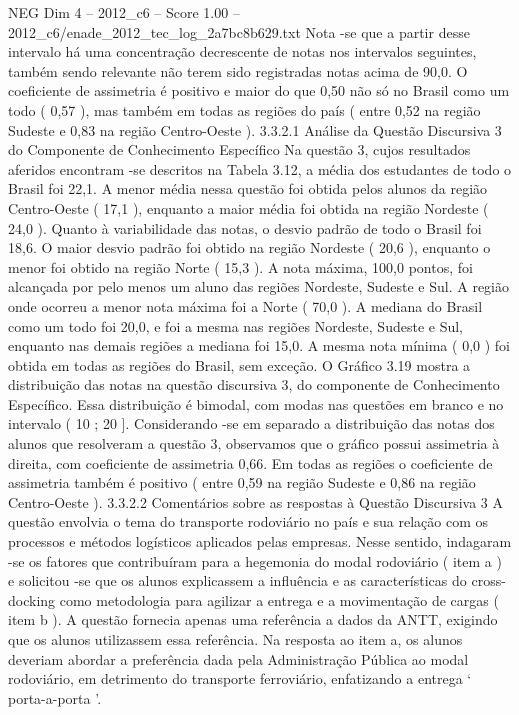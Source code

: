 \begin{textsample}{NEG Dim 4 – 2012\_c6 – Score 1.00 – 2012\_c6/enade\_2012\_tec\_log\_2a7bc8b629.txt}
Nota -se que a partir desse intervalo há uma concentração decrescente de notas nos intervalos seguintes, também sendo relevante não terem sido registradas notas acima de 90,0.
O coeficiente de assimetria é positivo e maior do que 0,50 não só no Brasil como um todo ( 0,57 ), mas também em todas as regiões do país ( entre 0,52 na região Sudeste e 0,83 na região Centro-Oeste ). 3.3.2.1 Análise da Questão Discursiva 3 do Componente de Conhecimento Específico Na questão 3, cujos resultados aferidos encontram -se descritos na Tabela 3.12, a média dos estudantes de todo o Brasil foi 22,1.
A menor média nessa questão foi obtida pelos alunos da região Centro-Oeste ( 17,1 ), enquanto a maior média foi obtida na região Nordeste ( 24,0 ).
Quanto à variabilidade das notas, o desvio padrão de todo o Brasil foi 18,6.
O maior desvio padrão foi obtido na região Nordeste ( 20,6 ), enquanto o menor foi obtido na região Norte ( 15,3 ).
A nota máxima, 100,0 pontos, foi alcançada por pelo menos um aluno das regiões Nordeste, Sudeste e Sul.
A região onde ocorreu a menor nota máxima foi a Norte ( 70,0 ).
A mediana do Brasil como um todo foi 20,0, e foi a mesma nas regiões Nordeste, Sudeste e Sul, enquanto nas demais regiões a mediana foi 15,0.
A mesma nota mínima ( 0,0 ) foi obtida em todas as regiões do Brasil, sem exceção.
O Gráfico 3.19 mostra a distribuição das notas na questão discursiva 3, do componente de Conhecimento Específico.
Essa distribuição é bimodal, com modas nas questões em branco e no intervalo ( 10 ; 20 ].
Considerando -se em separado a distribuição das notas dos alunos que resolveram a questão 3, observamos que o gráfico possui assimetria à direita, com coeficiente de assimetria 0,66.
Em todas as regiões o coeficiente de assimetria também é positivo ( entre 0,59 na região Sudeste e 0,86 na região Centro-Oeste ). 3.3.2.2 Comentários sobre as respostas à Questão Discursiva 3 A questão envolvia o tema do transporte rodoviário no país e sua relação com os processos e métodos logísticos aplicados pelas empresas.
Nesse sentido, indagaram -se os fatores que contribuíram para a hegemonia do modal rodoviário ( item a ) e solicitou -se que os alunos explicassem a influência e as características do cross-docking como metodologia para agilizar a entrega e a movimentação de cargas ( item b ).
A questão fornecia apenas uma referência a dados da ANTT, exigindo que os alunos utilizassem essa referência.
Na resposta ao item a, os alunos deveriam abordar a preferência dada pela Administração Pública ao modal rodoviário, em detrimento do transporte ferroviário, enfatizando a entrega ‘ porta-a-porta ’.

\end{textsample}
